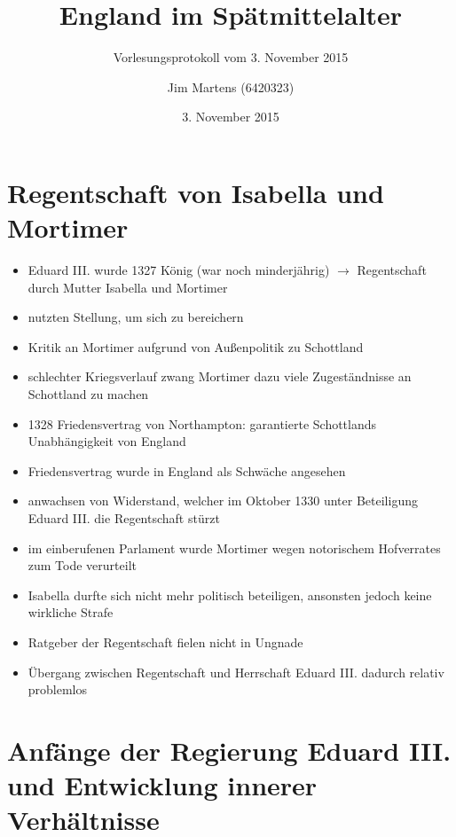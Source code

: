 \documentclass[10pt,a4paper,oneside,ngerman,numbers=noenddot]{scrartcl}
\newenvironment{myitemize}{\begin{itemize}\itemsep -2pt}{\end{itemize}} %
\begin{document}
\author{Jim Martens (6420323)}
\title{England im Spätmittelalter}
\subtitle{Vorlesungsprotokoll vom 3. November 2015}
\date{3. November 2015}
\maketitle

\section*{Regentschaft von Isabella und Mortimer}

\begin{myitemize}
	\item Eduard III. wurde 1327 König (war noch minderjährig) \(\rightarrow\) Regentschaft durch Mutter Isabella und Mortimer
	\item nutzten Stellung, um sich zu bereichern
	\item Kritik an Mortimer aufgrund von Außenpolitik zu Schottland
	\item schlechter Kriegsverlauf zwang Mortimer dazu viele Zugeständnisse an Schottland zu machen
	\item 1328 Friedensvertrag von Northampton: garantierte Schottlands Unabhängigkeit von England
	\item Friedensvertrag wurde in England als Schwäche angesehen
	\item anwachsen von Widerstand, welcher im Oktober 1330 unter Beteiligung Eduard III. die Regentschaft stürzt
	\item im einberufenen Parlament wurde Mortimer wegen notorischem Hofverrates zum Tode verurteilt
	\item Isabella durfte sich nicht mehr politisch beteiligen, ansonsten jedoch keine wirkliche Strafe
	\item Ratgeber der Regentschaft fielen nicht in Ungnade
	\item Übergang zwischen Regentschaft und Herrschaft Eduard III. dadurch relativ problemlos
\end{myitemize}

\section*{Anfänge der Regierung Eduard III. und Entwicklung innerer Verhältnisse}
\end{document}
